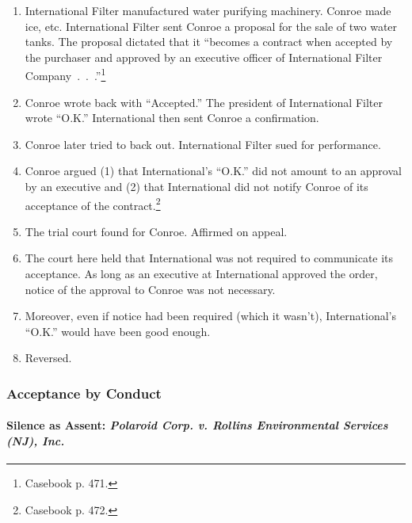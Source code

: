 \begin{enumerate}
    \item International Filter manufactured water purifying machinery. Conroe 
    made ice, etc. International Filter sent Conroe a proposal for the sale of 
    two water tanks. The proposal dictated that it ``becomes a contract when 
    accepted by the purchaser and approved by an executive officer of 
    International Filter Company~.~.~.''\footnote{Casebook p. 471.}
    \item Conroe wrote back with ``Accepted.'' The president of International 
    Filter wrote ``O.K.'' International then sent Conroe a confirmation.
    \item Conroe later tried to back out. International Filter sued for 
    performance.
    \item Conroe argued (1) that International's ``O.K.'' did not amount to an 
    approval by an executive and (2) that International did not notify Conroe 
    of its acceptance of the contract.\footnote{Casebook p. 472.}
    \item The trial court found for Conroe. Affirmed on appeal.
    \item The court here held that International was not required to 
    communicate its acceptance. As long as an executive at International 
    approved the order, notice of the approval to Conroe was not necessary.
    \item Moreover, even if notice had been required (which it wasn't), 
    International's ``O.K.'' would have been good enough.
    \item Reversed.
\end{enumerate}

\subsubsection{Acceptance by Conduct}

\paragraph{Silence as Assent: \emph{Polaroid Corp. v. Rollins Environmental 
Services (NJ), Inc.}}

